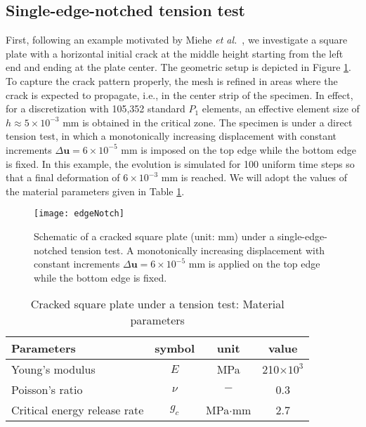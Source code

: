 
\subsection{Single-edge-notched tension test}
{First, following an example motivated by Miehe \emph{et al.}~\cite{miehe2010phase},} we %
investigate a square plate with a horizontal {initial} crack at the middle height starting from the left end and ending at the plate center. The geometric setup is depicted in Figure \ref{Fig:Notched_geometry}. To capture the crack pattern properly, the mesh is refined in areas where the crack is expected to propagate, i.e., in the center strip of the specimen. In effect, for a discretization with 105,352 standard $P_1$ elements, an effective element size of $h\approx 5\times 10^{-3}$ mm is obtained in the critical zone. The specimen is under a direct tension test, in which a monotonically increasing displacement with constant increments $\Delta\bm{u}=6 \times 10^{-5}$ mm is imposed on the top edge while the bottom edge is fixed. In this example, the evolution is simulated for 100 uniform time steps so that a final deformation of $6\times 10^{-3}$ mm is reached. We will adopt the values of the material parameters given in Table \ref{Tab:Notched_input}. %
\begin{figure}[htbp]
    \centering
    \texttt{[image: edgeNotch]}
    \caption{Schematic of a cracked square plate (unit: mm) under a single-edge-notched tension test. 
    A monotonically increasing displacement with constant increments $\Delta\bm{u}=6\times 10^{-5}$ mm is applied on the top edge while the bottom edge is fixed.}
    \label{Fig:Notched_geometry}
\end{figure}

\begin{table}[htbp]
    \centering
    \caption{Cracked square plate under a tension test: Material parameters \cite{ambati2015review}}
    \begin{tabular}{l c c c}
    \hline 
         Parameters & symbol & unit& value \\
    \hline 
         Young's modulus & $E$ &MPa&  210$\times 10^{3}$\\
         Poisson's ratio & $\nu$ &$-$&  0.3\\
         Critical energy release rate & $g_c$ &MPa$\cdot$mm&  2.7\\
            \hline      
    \end{tabular}
    \label{Tab:Notched_input}
\end{table}

